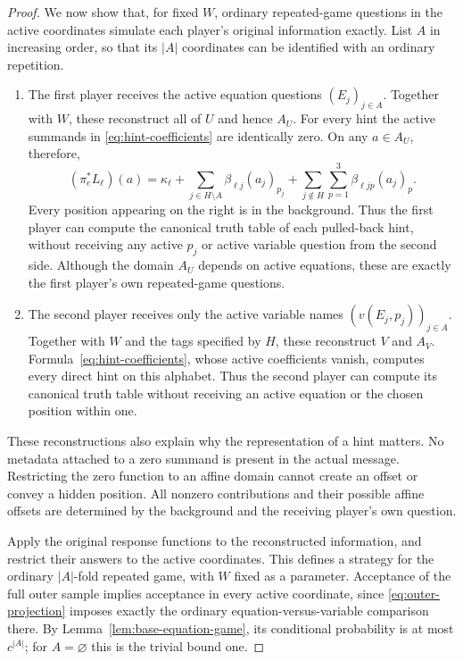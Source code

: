 \begin{proof}
We now show that, for fixed $W$, ordinary repeated-game questions in the
active coordinates simulate each player's original information exactly.
List $A$ in increasing order, so that its $|A|$ coordinates can be identified
with an ordinary repetition.
\begin{enumerate}[label=\textup{(\roman*)}]
\item The first player receives the active equation questions $(E_j)_{j\in A}$.
Together with $W$, these reconstruct all of $U$ and hence $A_U$.
For every hint the active summands in \eqref{eq:hint-coefficients} are
identically zero. On any $a\in A_U$, therefore,
\[
 (\pi_e^*L_\ell)(a)=\kappa_\ell+
    \sum_{j\in H\setminus A}\beta_{\ell j}(a_j)_{p_j}+
    \sum_{j\notin H}\sum_{p=1}^3\beta_{\ell jp}(a_j)_p.
\]
Every position appearing on the right is in the background. Thus the first
player can compute the canonical truth table of each pulled-back hint,
without receiving any active $p_j$ or active variable question from the
second side. Although the domain $A_U$ depends on active equations, these
are exactly the first player's own repeated-game questions.
\item The second player receives only the active variable names
$(v(E_j,p_j))_{j\in A}$. Together with $W$ and the tags specified by $H$,
these reconstruct $V$ and $A_V$. Formula~\eqref{eq:hint-coefficients}, whose
active coefficients vanish, computes every direct hint on this alphabet.
Thus the second player can compute its canonical truth table without
receiving an active equation or the chosen position within one.
\end{enumerate}
These reconstructions also explain why the representation of a hint
matters. No metadata attached to a zero summand is present in the actual
message. Restricting the zero function to an affine domain cannot create
an offset or convey a hidden position. All nonzero contributions and their
possible affine offsets are determined by the background and the receiving
player's own question.

Apply the original response functions to the reconstructed information,
and restrict their answers to the active coordinates. This defines a
strategy for the ordinary $|A|$-fold repeated game, with $W$ fixed as a
parameter. Acceptance of the full outer sample implies acceptance in
every active coordinate, since \eqref{eq:outer-projection} imposes exactly
the ordinary equation-versus-variable comparison there. By
Lemma~\ref{lem:base-equation-game}, its conditional probability is at most
$c^{|A|}$; for $A=\varnothing$ this is the trivial bound one.


\end{proof}
